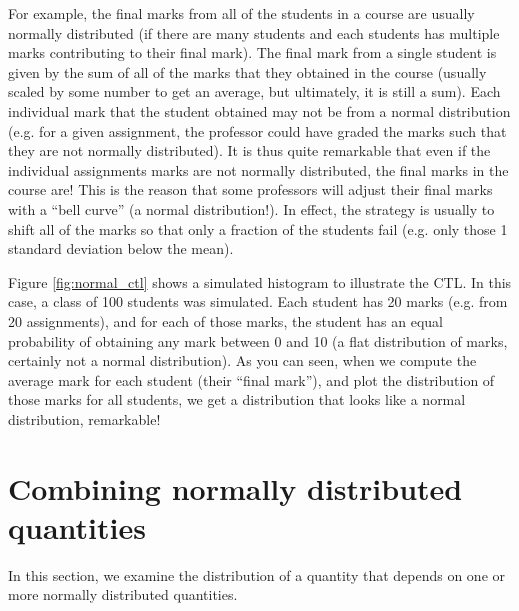  For example, the final marks from all of the students in a course are usually normally distributed (if there are many students and each students has multiple marks contributing to their final mark). The final mark from a single student is given by the sum of all of the marks that they obtained in the course (usually scaled by some number to get an average, but ultimately, it is still a sum). Each individual mark that the student obtained may not be from a normal distribution (e.g. for a given assignment, the professor could have graded the marks such that they are not normally distributed). It is thus quite remarkable that even if the individual assignments marks are not normally distributed, the final marks in the course are! This is the reason that some professors will adjust their final marks with a ``bell curve'' (a normal distribution!). In effect, the strategy is usually to shift all of the marks so that only a fraction of the students fail (e.g. only those 1 standard deviation below the mean). 
 
Figure \ref{fig:normal_ctl} shows a simulated histogram to illustrate the CTL. In this case, a class of 100 students was simulated. Each student has 20 marks (e.g. from 20 assignments), and for each of those marks, the student has an equal probability of obtaining any mark between 0 and 10 (a flat distribution of marks, certainly not a normal distribution). As you can seen, when we compute the average mark for each student (their ``final mark''), and plot the distribution of those marks for all students, we get a distribution that looks like a normal distribution, remarkable!
 

\section{Combining normally distributed quantities}
In this section, we examine the distribution of a quantity that depends on one or more normally distributed quantities.

